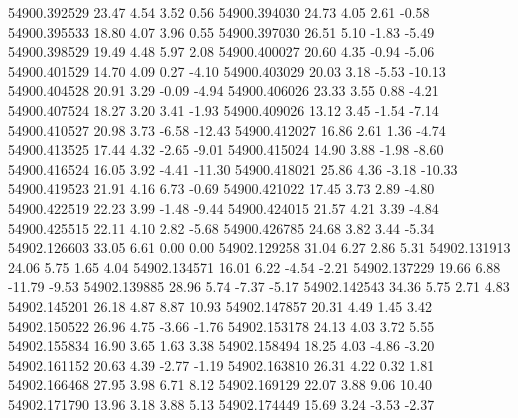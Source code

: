 54900.392529       23.47        4.54        3.52        0.56
54900.394030       24.73        4.05        2.61       -0.58
54900.395533       18.80        4.07        3.96        0.55
54900.397030       26.51        5.10       -1.83       -5.49
54900.398529       19.49        4.48        5.97        2.08
54900.400027       20.60        4.35       -0.94       -5.06
54900.401529       14.70        4.09        0.27       -4.10
54900.403029       20.03        3.18       -5.53      -10.13
54900.404528       20.91        3.29       -0.09       -4.94
54900.406026       23.33        3.55        0.88       -4.21
54900.407524       18.27        3.20        3.41       -1.93
54900.409026       13.12        3.45       -1.54       -7.14
54900.410527       20.98        3.73       -6.58      -12.43
54900.412027       16.86        2.61        1.36       -4.74
54900.413525       17.44        4.32       -2.65       -9.01
54900.415024       14.90        3.88       -1.98       -8.60
54900.416524       16.05        3.92       -4.41      -11.30
54900.418021       25.86        4.36       -3.18      -10.33
54900.419523       21.91        4.16        6.73       -0.69
54900.421022       17.45        3.73        2.89       -4.80
54900.422519       22.23        3.99       -1.48       -9.44
54900.424015       21.57        4.21        3.39       -4.84
54900.425515       22.11        4.10        2.82       -5.68
54900.426785       24.68        3.82        3.44       -5.34
54902.126603       33.05        6.61        0.00        0.00
54902.129258       31.04        6.27        2.86        5.31
54902.131913       24.06        5.75        1.65        4.04
54902.134571       16.01        6.22       -4.54       -2.21
54902.137229       19.66        6.88      -11.79       -9.53
54902.139885       28.96        5.74       -7.37       -5.17
54902.142543       34.36        5.75        2.71        4.83
54902.145201       26.18        4.87        8.87       10.93
54902.147857       20.31        4.49        1.45        3.42
54902.150522       26.96        4.75       -3.66       -1.76
54902.153178       24.13        4.03        3.72        5.55
54902.155834       16.90        3.65        1.63        3.38
54902.158494       18.25        4.03       -4.86       -3.20
54902.161152       20.63        4.39       -2.77       -1.19
54902.163810       26.31        4.22        0.32        1.81
54902.166468       27.95        3.98        6.71        8.12
54902.169129       22.07        3.88        9.06       10.40
54902.171790       13.96        3.18        3.88        5.13
54902.174449       15.69        3.24       -3.53       -2.37

